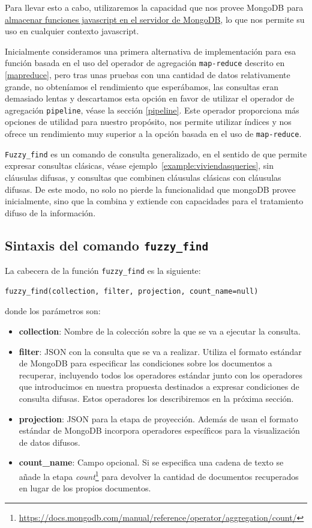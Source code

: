 Para llevar esto a cabo, utilizaremos la capacidad que nos provee MongoDB para \href{https://docs.mongodb.com/manual/tutorial/store-javascript-function-on-server/}{almacenar funciones javascript en el servidor de MongoDB}, lo que nos permite su uso en cualquier contexto javascript.

Inicialmente consideramos una primera alternativa de implementación para esa función basada en el uso del operador de agregación \texttt{map-reduce} descrito en \ref{mapreduce}, pero tras unas pruebas con una cantidad de datos relativamente grande, no obteníamos el rendimiento que esperábamos, las consultas eran demasiado lentas y descartamos esta opción en favor de utilizar el operador de agregación \texttt{pipeline}, véase la sección \ref{pipeline}. Este operador proporciona más opciones de utilidad para nuestro propósito, nos permite utilizar índices y nos ofrece un rendimiento muy superior a la opción basada en el uso de \texttt{map-reduce}.

\texttt{Fuzzy\_find} es un comando de consulta generalizado, en el sentido de que permite expresar consultas clásicas, véase ejemplo~\ref{example:viviendasqueries}, sin cláusulas difusas, y consultas que combinen cláusulas clásicas con cláusulas difusas. De este modo, no solo no pierde la funcionalidad que mongoDB provee inicialmente, sino que la combina y extiende con capacidades para el tratamiento difuso de la información.

\subsection{Sintaxis del comando \texttt{fuzzy\_find}}

La cabecera de la función \texttt{fuzzy\_find} es la siguiente:

\begin{verbatim}
fuzzy_find(collection, filter, projection, count_name=null)
\end{verbatim}
%
donde los parámetros son:

\begin{itemize}
    \item \textbf{collection}: Nombre de la colección sobre la que se va a ejecutar la consulta.
    \item \textbf{filter}: JSON con la consulta que se va a realizar. Utiliza el formato estándar de MongoDB para especificar las condiciones sobre los documentos a recuperar, incluyendo todos los operadores estándar junto con los operadores que introducimos en nuestra propuesta destinados a expresar condiciones de consulta difusas. Estos operadores los describiremos en la próxima sección.
    \item \textbf{projection}: JSON para la etapa de proyección. Además de usan el formato estándar de MongoDB incorpora operadores específicos para la visualización de datos difusos.
    \item \textbf{count\_name}: Campo opcional. Si se especifica una cadena de texto se añade la etapa \textit{count}\footnote{\url{https://docs.mongodb.com/manual/reference/operator/aggregation/count/}} para devolver la cantidad de documentos recuperados en lugar de los propios documentos.
\end{itemize}

